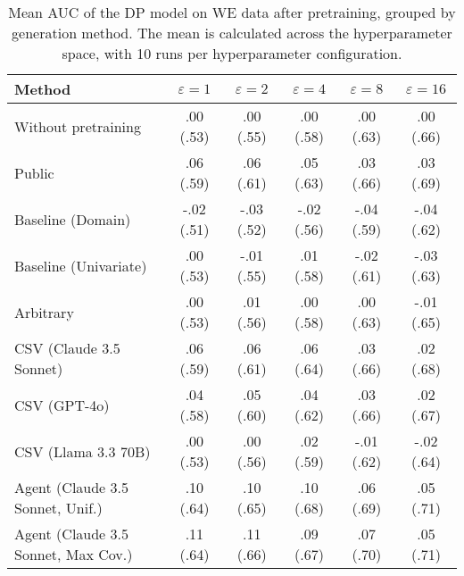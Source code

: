 \begin{table}[h!]
    \centering
    \caption{Mean AUC of the DP model on WE data after pretraining, grouped by generation method. The mean is calculated across the hyperparameter space, with 10 runs per hyperparameter configuration.}
    \label{tab:epsilon_comparison}
    \begin{tabular}{lccccc}
    \toprule
    Method & $\varepsilon=1$ & $\varepsilon=2$ & $\varepsilon=4$ & $\varepsilon=8$ & $\varepsilon=16$ \\
    \midrule
    Without pretraining & .00 {\small (.53)} & .00 {\small (.55)} & .00 {\small (.58)} & .00 {\small (.63)} & .00 {\small (.66)} \\
    \arrayrulecolor{black!50!}\midrule
    Public & .06 {\small (.59)} & .06 {\small (.61)} & .05 {\small (.63)} & .03 {\small (.66)} & \cellcolor{bronze!30}.03 {\small (.69)} \\
    \arrayrulecolor{black!50!}\midrule
    Baseline (Domain) & -.02 {\small (.51)} & -.03 {\small (.52)} & -.02 {\small (.56)} & -.04 {\small (.59)} & -.04 {\small (.62)} \\
    Baseline (Univariate) & .00 {\small (.53)} & -.01 {\small (.55)} & .01 {\small (.58)} & -.02 {\small (.61)} & -.03 {\small (.63)} \\
    \arrayrulecolor{black!50!}\midrule
    Arbitrary & .00 {\small (.53)} & .01 {\small (.56)} & .00 {\small (.58)} & .00 {\small (.63)} & -.01 {\small (.65)} \\
    \arrayrulecolor{black!50!}\midrule
    CSV (Claude 3.5 Sonnet) & .06 {\small (.59)} & .06 {\small (.61)} & .06 {\small (.64)} & \cellcolor{bronze!30}.03 {\small (.66)} & .02 {\small (.68)} \\
    CSV (GPT-4o) & .04 {\small (.58)} & .05 {\small (.60)} & .04 {\small (.62)} & .03 {\small (.66)} & .02 {\small (.67)} \\
    CSV (Llama 3.3 70B) & .00 {\small (.53)} & .00 {\small (.56)} & .02 {\small (.59)} & -.01 {\small (.62)} & -.02 {\small (.64)} \\
    \arrayrulecolor{black!50!}\midrule
    Agent (Claude 3.5 Sonnet, Unif.) & \cellcolor{silver!30}.10 {\small (.64)} & \cellcolor{silver!30}.10 {\small (.65)} & \cellcolor{gold!30}.10 {\small (.68)} & \cellcolor{silver!30}.06 {\small (.69)} & \cellcolor{silver!30}.05 {\small (.71)} \\
    Agent (Claude 3.5 Sonnet, Max Cov.) & \cellcolor{gold!30}.11 {\small (.64)} & \cellcolor{gold!30}.11 {\small (.66)} & \cellcolor{silver!30}.09 {\small (.67)} & \cellcolor{gold!30}.07 {\small (.70)} & \cellcolor{gold!30}.05 {\small (.71)} \\

\end{tabular}
\end{table}
